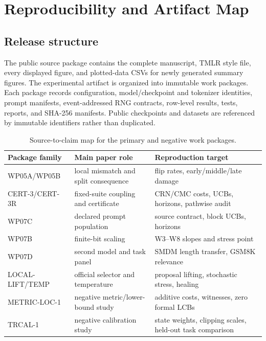 \section{Reproducibility and Artifact Map}
\label{app:repro}

\subsection{Release structure}
The public source package contains the complete manuscript, TMLR style file, every displayed figure, and plotted-data CSVs for newly generated summary figures. The experimental artifact is organized into immutable work packages. Each package records configuration, model/checkpoint and tokenizer identities, prompt manifests, event-addressed RNG contracts, row-level results, tests, reports, and SHA-256 manifests. Public checkpoints and datasets are referenced by immutable identifiers rather than duplicated.

\begin{table}[ht]
\caption{Source-to-claim map for the primary and negative work packages.}
\label{tab:artifact-map}
\centering\small
\begin{tabular}{@{}p{.22\linewidth}p{.30\linewidth}p{.38\linewidth}@{}}
\toprule
Package family & Main paper role & Reproduction target \\
\midrule
WP05A/WP05B & local mismatch and split consequence & flip rates, early/middle/late damage \\
CERT-3/CERT-3R & fixed-suite coupling and certificate & CRN/CMC costs, UCBs, horizons, pathwise audit \\
WP07C & declared prompt population & source contract, block UCBs, horizons \\
WP07B & finite-bit scaling & W3--W8 slopes and stress point \\
WP07D & second model and task panel & SMDM length transfer, GSM8K relevance \\
LOCAL-LIFT/TEMP & official selector and temperature & proposal lifting, stochastic stress, healing \\
METRIC-LOC-1 & negative metric/lower-bound study & additive costs, witnesses, zero formal LCBs \\
TRCAL-1 & negative calibration study & state weights, clipping scales, held-out task comparison \\
\bottomrule
\end{tabular}
\end{table}

